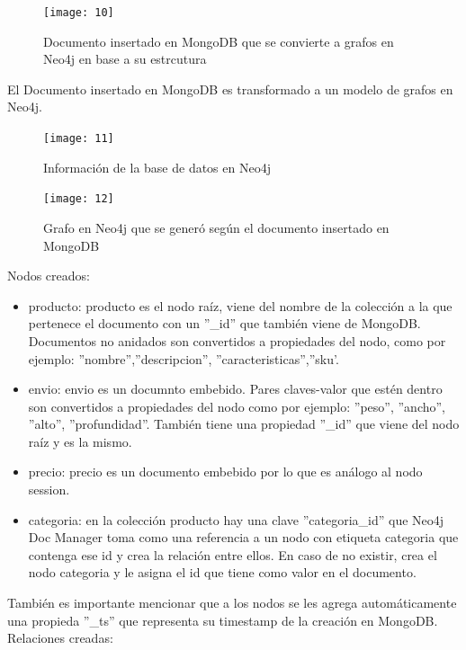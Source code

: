 \documentclass[conference]{IEEEtran}
\begin{document}
\begin{figure}[!h]
\centering
\texttt{[image: 10]}
\caption{Documento insertado en MongoDB que se convierte a grafos en Neo4j en base a su estrcutura}
\label{}
\end{figure}

El Documento insertado en MongoDB es transformado a un modelo de grafos en Neo4j.\\

\begin{figure}[!h]
\centering
\texttt{[image: 11]}
\caption{Informaci\'on de la base de datos en Neo4j}
\label{}
\end{figure}

\begin{figure}[!h]
\centering
\texttt{[image: 12]}
\caption{Grafo en Neo4j que se gener\'o seg\'un el documento insertado en MongoDB}
\label{}
\end{figure}

Nodos creados:\\
\begin{itemize}
\item producto: producto es el nodo ra\'iz, viene del nombre de la colecci\'on a la que pertenece el documento con un  ''\_id'' que tambi\'en viene de MongoDB. Documentos no anidados son convertidos a propiedades del nodo, como por ejemplo: ''nombre'',''descripcion'', ''caracteristicas'',''sku'.
\item envio: envio es un documnto embebido. Pares claves-valor que est\'en dentro son convertidos a propiedades del nodo como por ejemplo: ''peso'', ''ancho'', ''alto'', ''profundidad''. Tambi\'en tiene una propiedad ''\_id'' que viene del nodo ra\'iz y es la mismo.
\item precio: precio es un documento embebido por lo que es análogo al nodo session.
\item categoria: en la colecci\'on producto hay una clave ''categoria\_id'' que Neo4j Doc Manager toma como una referencia a un nodo con etiqueta categoria que contenga ese id y crea la relaci\'on entre ellos. En caso de no existir, crea el nodo categoria y le asigna el id que tiene como valor en el documento.
\end{itemize}
También es importante mencionar que a los nodos se les agrega autom\'aticamente una propieda ''\_ts'' que representa su timestamp de la creaci\'on en MongoDB.\\

Relaciones creadas:\\
\end{document}
